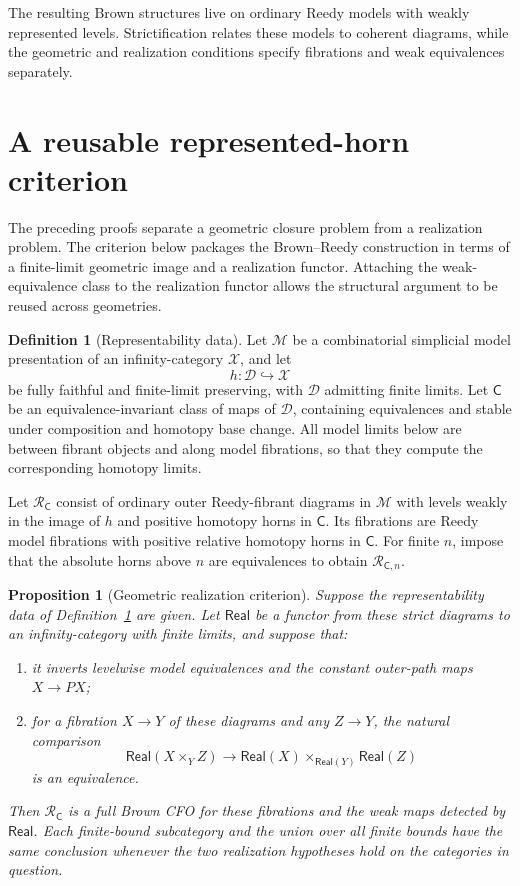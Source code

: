 \documentclass[12pt]{amsart}
\newtheorem{prop}[thm]{Proposition}
\theoremstyle{definition}
\newtheorem{defn}[thm]{Definition}
\theoremstyle{remark}
\numberwithin{equation}{section}
\newcommand{\CM}{\mathcal M}
\begin{document}
The resulting Brown structures live on ordinary Reedy
models with weakly represented levels. Strictification
relates these models to coherent diagrams, while the
geometric and realization conditions specify fibrations
and weak equivalences separately.

\section{A reusable represented-horn criterion}
\label{sec:represented-criterion}

The preceding proofs separate a geometric closure problem
from a realization problem. The criterion below packages
the Brown--Reedy construction in terms of a finite-limit
geometric image and a realization functor. Attaching the
weak-equivalence class to the realization functor allows
the structural argument to be reused across geometries.

\begin{defn}[Representability data]
\label{def:representability-data}
Let $\CM$ be a combinatorial simplicial model presentation
of an infinity-category $\mathcal X$, and let
\[
 h:\mathcal D\hookrightarrow\mathcal X
\]
be fully faithful and finite-limit preserving, with
$\mathcal D$ admitting finite limits.
Let $\mathsf C$ be an equivalence-invariant class of
maps of $\mathcal D$, containing equivalences and
stable under composition and homotopy base change.
All model limits below are between fibrant objects
and along model fibrations, so that they compute
the corresponding homotopy limits.

Let $\mathscr R_{\mathsf C}$ consist of ordinary outer
Reedy-fibrant diagrams in $\CM$ with levels weakly in
the image of $h$ and positive homotopy horns in $\mathsf C$.
Its fibrations are Reedy model fibrations with positive
relative homotopy horns in $\mathsf C$.
For finite $n$, impose that the absolute horns above
$n$ are equivalences to obtain $\mathscr R_{\mathsf C,n}$.
\end{defn}

\begin{prop}[Geometric realization criterion]
\label{prop:geometric-realization-criterion}
Suppose the representability data of
Definition~\ref{def:representability-data} are given.
Let $\mathsf{Real}$ be a functor from these strict
diagrams to an infinity-category with finite limits,
and suppose that:
\begin{enumerate}
\item it inverts levelwise model equivalences and the
constant outer-path maps $X\to PX$;
\item for a fibration $X\to Y$ of these diagrams and
any $Z\to Y$, the natural comparison
\[
 \mathsf{Real}(X\times_Y Z)\longrightarrow
 \mathsf{Real}(X)\times_{\mathsf{Real}(Y)}
                          \mathsf{Real}(Z)
\]
is an equivalence.
\end{enumerate}
Then $\mathscr R_{\mathsf C}$ is a full Brown CFO
for these fibrations and the weak maps detected by
$\mathsf{Real}$. Each finite-bound subcategory and the union
over all finite bounds have the same conclusion whenever
the two realization hypotheses hold on the categories in question.
\end{prop}
\end{document}

